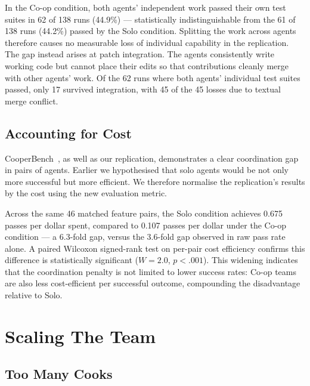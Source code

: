 \documentclass[11pt,a4paper]{article}
\begin{document}
In the Co-op condition, both agents' independent work passed their own test suites in 62 of 138 runs (44.9\%) --- statistically indistinguishable from the 61 of 138 runs (44.2\%) passed by the Solo condition. Splitting the work across agents therefore causes no measurable loss of individual capability in the replication. The gap instead arises at patch integration. The agents consistently write working code but cannot place their edits so that contributions cleanly merge with other agents' work. Of the 62 runs where both agents' individual test suites passed, only 17 survived integration, with 45 of the 45 losses due to textual merge conflict.

\subsection{Accounting for Cost}\label{sec:replcost}

CooperBench~\cite{khatua2026cooperbench}, as well as our replication, demonstrates a clear coordination gap in pairs of agents. Earlier we hypothesised that solo agents would be not only more successful but more efficient. We therefore normalise the replication's results by the cost using the new evaluation metric.

Across the same 46 matched feature pairs, the Solo condition achieves 0.675 passes per dollar spent, compared to 0.107 passes per dollar under the Co-op condition --- a 6.3-fold gap, versus the 3.6-fold gap observed in raw pass rate alone. A paired Wilcoxon signed-rank test on per-pair cost efficiency confirms this difference is statistically significant ($W = 2.0$, $p < .001$). This widening indicates that the coordination penalty is not limited to lower success rates: Co-op teams are also less cost-efficient per successful outcome, compounding the disadvantage relative to Solo.


%
%
\FloatBarrier
\section{Scaling The Team}\label{sec:growth}

\subsection{Too Many Cooks}\label{sec:toomanycooks}
\end{document}
